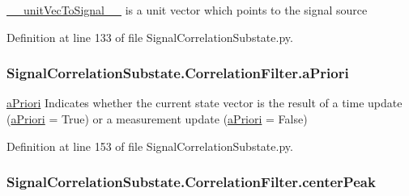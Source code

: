 \hyperlink{classSignalCorrelationSubstate_1_1CorrelationFilter_a18f7cac4d1943bc7f780db22f0355e4a}{\+\_\+\+\_\+unit\+Vec\+To\+Signal\+\_\+\+\_\+} is a unit vector which points to the signal source 



Definition at line 133 of file Signal\+Correlation\+Substate.\+py.

\subsubsection[{\texorpdfstring{a\+Priori}{aPriori}}]{\setlength{\rightskip}{0pt plus 5cm}Signal\+Correlation\+Substate.\+Correlation\+Filter.\+a\+Priori}\hypertarget{classSignalCorrelationSubstate_1_1CorrelationFilter_a960e7455c5def570629d69a2bf1cb288}{}\label{classSignalCorrelationSubstate_1_1CorrelationFilter_a960e7455c5def570629d69a2bf1cb288}


\hyperlink{classSignalCorrelationSubstate_1_1CorrelationFilter_a960e7455c5def570629d69a2bf1cb288}{a\+Priori} Indicates whether the current state vector is the result of a time update (\hyperlink{classSignalCorrelationSubstate_1_1CorrelationFilter_a960e7455c5def570629d69a2bf1cb288}{a\+Priori} = True) or a measurement update (\hyperlink{classSignalCorrelationSubstate_1_1CorrelationFilter_a960e7455c5def570629d69a2bf1cb288}{a\+Priori} = False) 



Definition at line 153 of file Signal\+Correlation\+Substate.\+py.

\subsubsection[{\texorpdfstring{center\+Peak}{centerPeak}}]{\setlength{\rightskip}{0pt plus 5cm}Signal\+Correlation\+Substate.\+Correlation\+Filter.\+center\+Peak}\hypertarget{classSignalCorrelationSubstate_1_1CorrelationFilter_a8e53182c2ff431a6a545a265cda6ba48}{}\label{classSignalCorrelationSubstate_1_1CorrelationFilter_a8e53182c2ff431a6a545a265cda6ba48}


